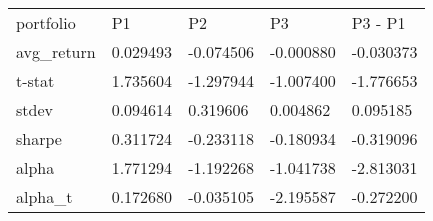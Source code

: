 \begin{tabular}{lllll}
\toprule
\midrule
portfolio & P1 & P2 & P3 & P3 - P1 \\
avg_return & 0.029493 & -0.074506 & -0.000880 & -0.030373 \\
t-stat & 1.735604 & -1.297944 & -1.007400 & -1.776653 \\
stdev & 0.094614 & 0.319606 & 0.004862 & 0.095185 \\
sharpe & 0.311724 & -0.233118 & -0.180934 & -0.319096 \\
alpha & 1.771294 & -1.192268 & -1.041738 & -2.813031 \\
alpha_t & 0.172680 & -0.035105 & -2.195587 & -0.272200 \\
\bottomrule
\end{tabular}
